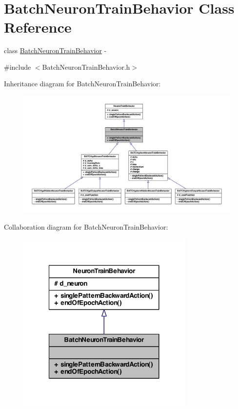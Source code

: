 \hypertarget{class_batch_neuron_train_behavior}{
\section{BatchNeuronTrainBehavior Class Reference}
\label{class_batch_neuron_train_behavior}
}


class \hyperlink{class_batch_neuron_train_behavior}{BatchNeuronTrainBehavior} -\/  




{\ttfamily \#include $<$BatchNeuronTrainBehavior.h$>$}



Inheritance diagram for BatchNeuronTrainBehavior:
\nopagebreak
\begin{figure}[H]
\begin{center}
\leavevmode
\includegraphics[width=400pt]{class_batch_neuron_train_behavior__inherit__graph}
\end{center}
\end{figure}


Collaboration diagram for BatchNeuronTrainBehavior:\nopagebreak
\begin{figure}[H]
\begin{center}
\leavevmode
\includegraphics[width=248pt]{class_batch_neuron_train_behavior__coll__graph}
\end{center}
\end{figure}
